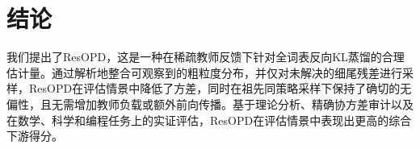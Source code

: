 \FloatBarrier
\section{结论}

我们提出了ResOPD，这是一种在稀疏教师反馈下针对全词表反向KL蒸馏的合理估计量。通过解析地整合可观察到的粗粒度分布，并仅对未解决的细尾残差进行采样，ResOPD在评估情景中降低了方差，同时在祖先同策略采样下保持了确切的无偏性，且无需增加教师负载或额外前向传播。基于理论分析、精确协方差审计以及在数学、科学和编程任务上的实证评估，ResOPD在评估情景中表现出更高的综合下游得分。

